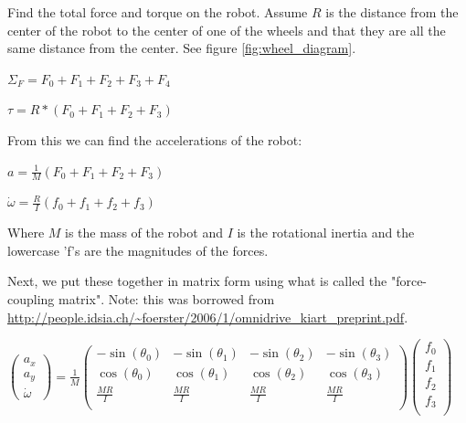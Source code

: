 \documentclass{article}
\begin{document}
Find the total force and torque on the robot.  Assume $R$ is the distance from the center of the robot to the center of one of the wheels and that they are all the same distance from the center. See figure \ref{fig:wheel_diagram}.

$\Sigma_F = F_0 + F_1 + F_2 + F_3 + F_4$

$\tau = R*(F_0+F_1+F_2+F_3)$

From this we can find the accelerations of the robot:

$a = \frac{1}{M} (F_0 + F_1 + F_2 + F_3)$

$\dot{\omega} = \frac{R}{I}(f_0 + f_1 + f_2 + f_3)$

Where $M $ is the mass of the robot and $I$ is the rotational inertia and the lowercase 'f's are the magnitudes of the forces.


Next, we put these together in matrix form using what is called the "force-coupling matrix".  Note: this was borrowed from \url{http://people.idsia.ch/~foerster/2006/1/omnidrive_kiart_preprint.pdf}.

\begin{math}
\left( \begin{array}{c}
	a_x \\
	a_y \\
	\dot{\omega}
\end{array} \right)
= \frac{1}{M}
\left( \begin{array}{cccc}
	-\sin(\theta_0) & -\sin(\theta_1) & -\sin(\theta_2) & -\sin(\theta_3) \\
	\cos(\theta_0) & \cos(\theta_1) & \cos(\theta_2) & \cos(\theta_3) \\
	\frac{M R}{I} & \frac{M R}{I} & \frac{M R}{I} & \frac{M R}{I} \\
\end{array} \right)
\left( \begin{array}{c}
	f_0 \\
	f_1 \\
	f_2 \\
	f_3 \\
\end{array} \right)
\end{math}
\end{document}

